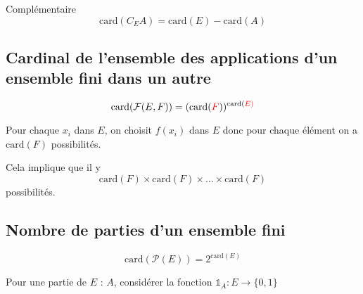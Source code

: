 \begin{Corollary}{Complémentaire}{}
\begin{equation}
  \mathrm{card}(C_EA) = \mathrm{card}(E) - \mathrm{card}(A)
\end{equation}
\end{Corollary}

\subsection{Cardinal de l'ensemble des applications d'un ensemble fini dans un autre} %
\label{sub:Cardinal de l'ensemble des applications d'un ensemble fini dans un autre}
\begin{Theorem}{}{}

\begin{equation}
  \mathrm{card}(\mathcal{F}(E,F)) = (\mathrm{card}({\color{red} F})) ^{\mathrm{card}(\color{red} E)} \color{red}
\end{equation}

\end{Theorem}

\begin{myproof}{}{}
Pour chaque $x_i$ dans $E$, on choisit $f(x_i)$ dans $E$ donc pour chaque élément on a $\mathrm{card}(F)$ possibilités.

Cela implique que il y 
\begin{equation}
  \mathrm{card}(F) \times \mathrm{card}(F) \times \dots \times \mathrm{card}(F)
\end{equation}
possibilités.
\end{myproof}





\subsection{Nombre de parties d'un ensemble fini} %
\label{sub:Nombre de parties d'un ensemble fini}

\begin{Theorem}{}{}

\begin{equation}
  \mathrm{card}(\mathscr{P}(E)) = 2 ^{\mathrm{card}(E)}
\end{equation}
\end{Theorem}

\begin{myproof}{}{}
  Pour une partie de $E$ : $A$, considérer la fonction $\mathbb{1} _{A} : E \to \{0, 1\}$
\end{myproof}



